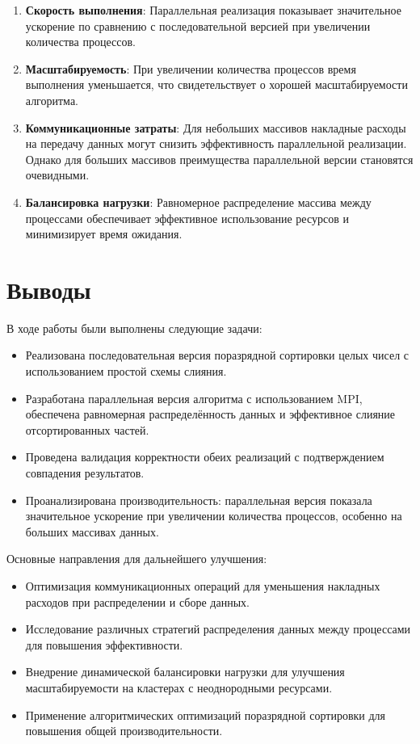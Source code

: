 \documentclass[12pt]{article}
\begin{document}
\begin{enumerate}
  \item \textbf{Скорость выполнения}: Параллельная реализация показывает значительное ускорение по сравнению с последовательной версией при увеличении количества процессов.
  
  \item \textbf{Масштабируемость}: При увеличении количества процессов время выполнения уменьшается, что свидетельствует о хорошей масштабируемости алгоритма.
  
  \item \textbf{Коммуникационные затраты}: Для небольших массивов накладные расходы на передачу данных могут снизить эффективность параллельной реализации. Однако для больших массивов преимущества параллельной версии становятся очевидными.
  
  \item \textbf{Балансировка нагрузки}: Равномерное распределение массива между процессами обеспечивает эффективное использование ресурсов и минимизирует время ожидания.
\end{enumerate}


\section{Выводы}

В ходе работы были выполнены следующие задачи:
\begin{itemize}
  \item Реализована последовательная версия поразрядной сортировки целых чисел с использованием простой схемы слияния.
  \item Разработана параллельная версия алгоритма с использованием MPI, обеспечена равномерная распределённость данных и эффективное слияние отсортированных частей.
  \item Проведена валидация корректности обеих реализаций с подтверждением совпадения результатов.
  \item Проанализирована производительность: параллельная версия показала значительное ускорение при увеличении количества процессов, особенно на больших массивах данных.
\end{itemize}

Основные направления для дальнейшего улучшения:
\begin{itemize}
  \item Оптимизация коммуникационных операций для уменьшения накладных расходов при распределении и сборе данных.
  \item Исследование различных стратегий распределения данных между процессами для повышения эффективности.
  \item Внедрение динамической балансировки нагрузки для улучшения масштабируемости на кластерах с неоднородными ресурсами.
  \item Применение алгоритмических оптимизаций поразрядной сортировки для повышения общей производительности.
\end{itemize}
\end{document}
